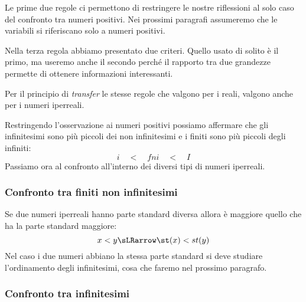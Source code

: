 \begin{osservazione}
Le prime due regole ci permettono di restringere le nostre riflessioni al 
solo caso del confronto tra numeri positivi.
Nei prossimi paragrafi assumeremo che le variabili si riferiscano solo a 
numeri positivi.
\end{osservazione}

\begin{osservazione}
Nella terza regola abbiamo presentato due criteri. Quello usato di solito
è il primo, ma useremo anche il secondo perché il rapporto tra due 
grandezze permette di ottenere informazioni interessanti.
\end{osservazione}

\vspace{1em}


Per il principio di \emph{transfer} le stesse regole che valgono per i 
reali, valgono anche per i numeri iperreali.


Restringendo l'osservazione ai numeri positivi possiamo affermare che gli 
infinitesimi sono più piccoli dei non infinitesimi e i finiti sono più 
piccoli degli infiniti:
\[i \quad < \quad fni \quad < \quad I\]
Passiamo ora al confronto all'interno dei diversi tipi di numeri iperreali.

\subsubsection{Confronto tra finiti non infinitesimi}
\label{subsubsec:insnum_confrontoreali}

Se due numeri iperreali hanno parte standard diversa allora è maggiore 
quello 
che ha la parte standard maggiore:
\[x < y \sLRarrow \st(x) < st(y)\]
Nel caso i due numeri abbiano la stessa parte standard si deve studiare 
l'ordinamento degli infinitesimi, cosa che faremo nel prossimo paragrafo.


\subsubsection{Confronto tra infinitesimi}
\label{subsubsec:insnum_confrontoreali}

